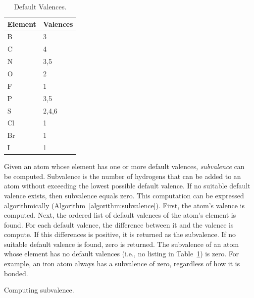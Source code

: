 \documentclass{article}
\begin{document}
\begin{table}
    \caption{Default Valences.}
    \centering
    \begin{tabular}{l l}
        \hline
        Element & Valences \\
        \hline
        B & 3 \\
        C & 4 \\
        N & 3,5 \\
        O & 2 \\
        F & 1 \\
        P & 3,5 \\
        S & 2,4,6 \\
        Cl & 1 \\
        Br & 1 \\
        I & 1 \\
        \hline
    \end{tabular}
    \label{table:default-valences}
\end{table}

Given an atom whose element has one or more default valences, \textit{subvalence} can be computed. Subvalence is the number of hydrogens that can be added to an atom without exceeding the lowest possible default valence. If no suitable default valence exists, then subvalence equals zero. This computation can be expressed algorithmically (Algorithm~\ref{algorithm:subvalence}). First, the atom's valence is computed. Next, the ordered list of default valences of the atom's element is found. For each default valence, the difference between it and the valence is compute. If this differences is positive, it is returned as the subvalence. If no suitable default valence is found, zero is returned. The subvalence of an atom whose element has no default valences (i.e., no listing in Table~\ref{table:default-valences}) is zero. For example, an iron atom always has a subvalence of zero, regardless of how it is bonded.

\begin{algorithm}
    \caption{Computing subvalence.}
    \label{algorithm:subvalence}
    
\end{algorithm}
\end{document}
